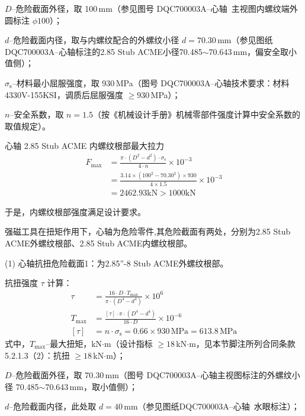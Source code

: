 $D$--危险截面外径，取 100\,mm（参见图号 DQC700003A--心轴\ 主视图内螺纹端外圆标注 $\phi 100$）；

$d$--危险截面内径，取与内螺纹配合的外螺纹小径 $d = 70.30\,\text{mm}$（参见图纸DQC700003A--心轴标注的2.85 Stub ACME小径70.485$\sim$70.643\,mm，偏安全取小值侧）；

$\sigma_{\mathrm{s}}$--材料最小屈服强度，取 930\,MPa（图号 DQC700003A--心轴技术要求：材料 4330V-155KSI，调质后屈服强度 $\ge 930$\,MPa）；

$n$--安全系数，取 $n = 1.5$（按《机械设计手册》机械零部件强度计算中安全系数的取值规定\cite{ref26}）。

心轴 2.85 Stub ACME 内螺纹根部最大拉力
\begin{equation}
    \begin{aligned}
        F_{\max} &= \frac{\pi \cdot (D^2 - d^2) \cdot \sigma_{\mathrm{s}}}{4 \cdot n} \times 10^{-3} \\
                 &= \frac{3.14 \times (100^2 - 70.30^2) \times 930}{4 \times 1.5} \times 10^{-3} \\
                 &= 2462.93 \text{kN} > 1000 \text{kN}
    \end{aligned}
\end{equation}

于是，内螺纹根部强度满足设计要求。


强磁工具在扭矩作用下，心轴为危险零件,其危险截面有两处，分别为2.85 Stub ACME外螺纹根部、2.85 Stub ACME内螺纹根部。

(1)	心轴抗扭危险截面1：为2.85”-8 Stub ACME外螺纹根部。

抗扭强度 $\tau$ 计算：
\begin{equation}
\begin{aligned}
    \tau &= \frac{16 \cdot D \cdot T_{\max}}{\pi \cdot (D^4 - d^4)} \times 10^6 \\
    T_{\max} &= \frac{[\tau] \cdot \pi \cdot (D^4 - d^4)}{16 \cdot D} \times 10^{-6} \\
    [\tau] &= n \cdot \sigma_{\mathrm{s}} = 0.66 \times 930\,\text{MPa} = 613.8\,\text{MPa}
\end{aligned}
\end{equation}
式中，$T_{\max}$--最大扭矩，kN$\cdot$m（设计指标 $\ge 18$\,kN$\cdot$m，见本节脚注所列合同条款 5.2.1.3（2）：抗扭 $\ge 18$\,kN$\cdot$m）；

$D$--危险截面外径，取 70.30\,mm（图号 DQC700003A--心轴主视图标注的外螺纹小径 70.485$\sim$70.643\,mm，取小值侧）；

$d$--危险截面内径，此处取 $d = 40\,\text{mm}$（参见图纸DQC700003A--心轴\ 水眼标注）；

